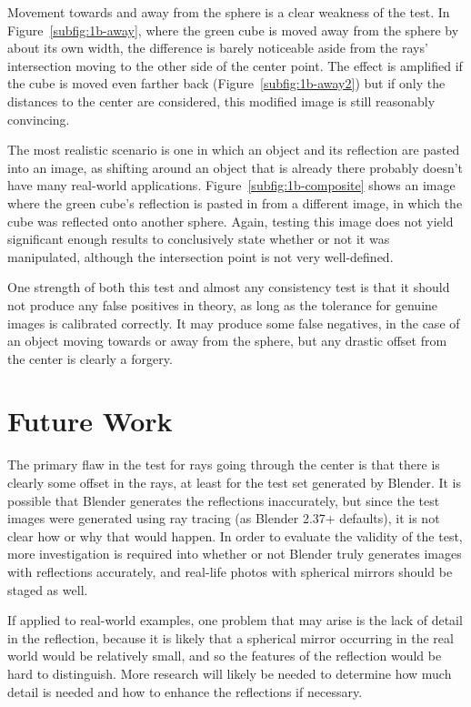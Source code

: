 \documentclass{thesis}
\begin{document}
Movement towards and away from the sphere is a clear weakness of the test. In Figure~\ref{subfig:1b-away}, where the green cube is moved away from the sphere by about its own width, the difference is barely noticeable aside from the rays' intersection moving to the other side of the center point. The effect is amplified if the cube is moved even farther back (Figure~\ref{subfig:1b-away2}) but if only the distances to the center are considered, this modified image is still reasonably convincing.

The most realistic scenario is one in which an object and its reflection are pasted into an image, as shifting around an object that is already there probably doesn't have many real-world applications. Figure~\ref{subfig:1b-composite} shows an image where the green cube's reflection is pasted in from a different image, in which the cube was reflected onto another sphere. Again, testing this image does not yield significant enough results to conclusively state whether or not it was manipulated, although the intersection point is not very well-defined.

One strength of both this test and almost any consistency test is that it should not produce any false positives in theory, as long as the tolerance for genuine images is calibrated correctly. It may produce some false negatives, in the case of an object moving towards or away from the sphere, but any drastic offset from the center is clearly a forgery.

\chapter{Future Work}
The primary flaw in the test for rays going through the center is that there is clearly some offset in the rays, at least for the test set generated by Blender. It is possible that Blender generates the reflections inaccurately, but since the test images were generated using ray tracing (as Blender 2.37+ defaults), it is not clear how or why that would happen. In order to evaluate the validity of the test, more investigation is required into whether or not Blender truly generates images with reflections accurately, and real-life photos with spherical mirrors should be staged as well.

If applied to real-world examples, one problem that may arise is the lack of detail in the reflection, because it is likely that a spherical mirror occurring in the real world would be relatively small, and so the features of the reflection would be hard to distinguish. More research will likely be needed to determine how much detail is needed and how to enhance the reflections if necessary.
\end{document}

